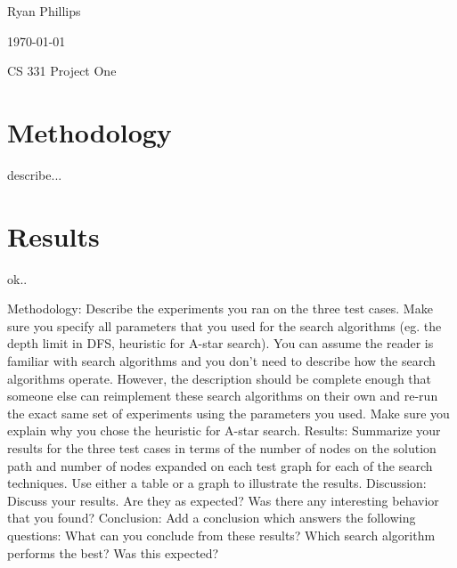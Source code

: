 \documentclass[letterpaper,12pt,titlepage]{article}
\def\name{Ryan Phillips}
\begin{document}
\hfill \name

\hfill \today

\hfill CS 331 Project One

\section*{Methodology} 

describe...

\section*{Results} 

ok..


Methodology: Describe the experiments you ran on the three test cases. Make sure you specify all parameters that you used for the search algorithms (eg. the depth limit in DFS, heuristic for A-star search). You can assume the reader is familiar with search algorithms and you don't need to describe how the search algorithms operate. However, the description should be complete enough that someone else can reimplement these search algorithms on their own and re-run the exact same set of experiments using the parameters you used. Make sure you explain why you chose the heuristic for A-star search.
Results: Summarize your results for the three test cases in terms of the number of nodes on the solution path and number of nodes expanded on each test graph for each of the search techniques. Use either a table or a graph to illustrate the results.
Discussion: Discuss your results. Are they as expected? Was there any interesting behavior that you found?
Conclusion: Add a conclusion which answers the following questions: What can you conclude from these results? Which search algorithm performs the best? Was this expected?
\end{document}
